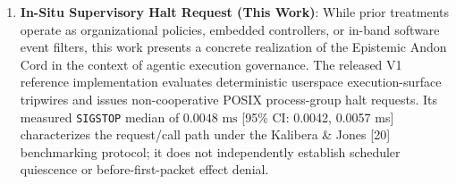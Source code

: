 \documentclass[
  10pt,letterpaper]{article}
\begin{document}
\begin{enumerate}
  application software dispatchers, leaving it vulnerable to runtime
  subversion, prompt injection, and in-memory monkey-patching.
\item
  \textbf{In-Situ Supervisory Halt Request (This Work)}: While prior
  treatments operate as organizational policies, embedded controllers,
  or in-band software event filters, this work presents a concrete
  realization of the Epistemic Andon Cord in the context of agentic
  execution governance. The released V1 reference implementation
  evaluates deterministic userspace execution-surface tripwires and
  issues non-cooperative POSIX process-group halt requests. Its measured
  \texttt{SIGSTOP} median of \textbf{\(0.0048\text{ ms}\)} {[}95\% CI:
  0.0042, 0.0057 ms{]} characterizes the request/call path under the
  Kalibera \& Jones {[}20{]} benchmarking protocol; it does not independently
  establish scheduler quiescence or before-first-packet effect denial.
\end{enumerate}
\end{document}
